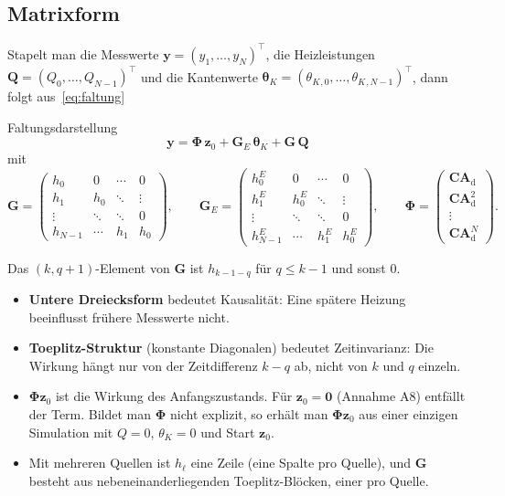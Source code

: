 \documentclass[11pt,a4paper]{article}
\numberwithin{equation}{section}
\newcommand{\thK}{\theta_{K}}
\newcommand{\vthK}{\symbf{\theta}_{K}}
\newcommand{\mC}{\mathbf{C}}
\newcommand{\mG}{\mathbf{G}}
\newcommand{\mGE}{\mathbf{G}_{E}}
\newcommand{\mAd}{\mathbf{A}_{\mathrm d}}
\newcommand{\mPhi}{\symbf{\Phi}}
\newcommand{\vz}{\mathbf{z}}
\newcommand{\vy}{\mathbf{y}}
\newcommand{\vQ}{\mathbf{Q}}
\begin{document}
\subsection{Matrixform}

Stapelt man die Messwerte $\vy=(y_1,\dots,y_N)^\top$, die Heizleistungen $\vQ=(Q_0,\dots,Q_{N-1})^\top$ und die Kantenwerte $\vthK=(\thK{}_{,0},\dots,\thK{}_{,N-1})^\top$, dann folgt aus~\eqref{eq:faltung}
\begin{ergebnis}{Faltungsdarstellung}
\begin{equation}
 \boxed{\;\vy=\mPhi\,\vz_0+\mGE\,\vthK+\mG\,\vQ\;}
 \label{eq:yGG}
\end{equation}
mit
\begin{equation}
 \mG=\begin{pmatrix}h_0&0&\cdots&0\\h_1&h_0&\ddots&\vdots\\\vdots&\ddots&\ddots&0\\h_{N-1}&\cdots&h_1&h_0\end{pmatrix},\qquad
 \mGE=\begin{pmatrix}h^E_0&0&\cdots&0\\h^E_1&h^E_0&\ddots&\vdots\\\vdots&\ddots&\ddots&0\\h^E_{N-1}&\cdots&h^E_1&h^E_0\end{pmatrix},\qquad
 \mPhi=\begin{pmatrix}\mC\mAd\\\mC\mAd^{2}\\\vdots\\\mC\mAd^{N}\end{pmatrix}.
\end{equation}
\end{ergebnis}
Das $(k,q{+}1)$-Element von $\mG$ ist $h_{k-1-q}$ für $q\le k-1$ und sonst $0$.
\begin{itemize}
 \item \textbf{Untere Dreiecksform} bedeutet Kausalität: Eine spätere Heizung beeinflusst frühere Messwerte nicht.
 \item \textbf{Toeplitz-Struktur} (konstante Diagonalen) bedeutet Zeitinvarianz: Die Wirkung hängt nur von der Zeitdifferenz $k-q$ ab, nicht von $k$ und $q$ einzeln.
 \item $\mPhi\vz_0$ ist die Wirkung des Anfangszustands. Für $\vz_0=\mathbf0$ (Annahme A8) entfällt der Term. Bildet man $\mPhi$ nicht explizit, so erhält man $\mPhi\vz_0$ aus einer einzigen Simulation mit $Q=0$, $\thK=0$ und Start $\vz_0$.
 \item Mit mehreren Quellen ist $h_\ell$ eine Zeile (eine Spalte pro Quelle), und $\mG$ besteht aus nebeneinanderliegenden Toeplitz-Blöcken, einer pro Quelle.
\end{itemize}
\end{document}
